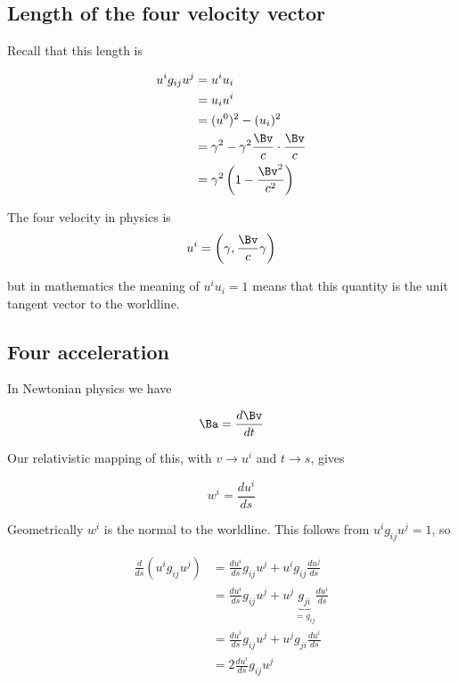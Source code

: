\subsection{Length of the four velocity vector}

Recall that this length is

\begin{align*}
u^i g_{ij} u^j 
&= u^i u_i  \\
&= u_i u^i  \\
&= (u^0)^2 - (u_i)^2 \\
&= \gamma^2 - \gamma^2 \frac{\Bv}{c} \cdot \frac{\Bv}{c} \\
&= \gamma^2 \left(1 - \frac{\Bv^2}{c^2} \right)
\end{align*}

The four velocity in physics is
\begin{equation}\label{eqn:relativisticElectrodynamicsL7:110}
u^i = \left( \gamma, \frac{\Bv}{c} \gamma \right)
\end{equation}

but in mathematics the meaning of $u^i u_i = 1$ means that this quantity is the unit tangent vector to the worldline.

\subsection{Four acceleration}

In Newtonian physics we have 

\begin{equation}\label{eqn:relativisticElectrodynamicsL7:111}
\Ba = \frac{d\Bv}{dt}
\end{equation}

Our relativistic mapping of this, with $v \rightarrow u^i$ and $t \rightarrow s$, gives

\begin{equation}\label{eqn:relativisticElectrodynamicsL7:120}
w^i = \frac{d u^i}{ds}
\end{equation}

Geometrically $w^i$ is the normal to the worldline.  This follows from $u^i g_{ij} u^j = 1$, so

\begin{align*}
\frac{d}{ds} \left( u^i g_{ij} u^j \right) 
&=
\frac{d u^i}{ds} g_{ij} u^j 
+u^i g_{ij} \frac{d u^j}{ds} \\
&=
\frac{d u^i}{ds} g_{ij} u^j 
+u^j \underbrace{g_{ji}}_{= g_{ij}} \frac{d u^i}{ds} \\
&=
\frac{d u^i}{ds} g_{ij} u^j 
+u^j g_{ji} \frac{d u^i}{ds} \\
&=
2 \frac{d u^i}{ds} g_{ij} u^j 
\end{align*}


